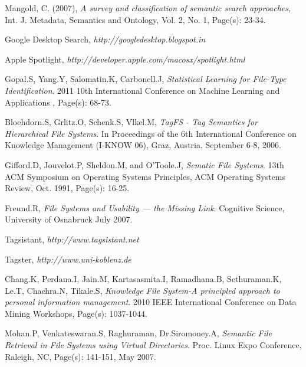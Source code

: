 ﻿\begin{thebibliography}{99}



Mangold, C. (2007), 
\emph{A survey and classification of semantic search approaches}, 
Int. J. Metadata, Semantics and Ontology, Vol. 2, No. 1, Page(s): 23-34.

Google Desktop Search,  
\emph{http://googledesktop.blogspot.in}

Apple Spotlight, 
\emph{http://developer.apple.com/macosx/spotlight.html}

Gopal.S, Yang.Y, Salomatin.K, Carbonell.J, 
\emph{Statistical Learning for File-Type Identification}.
2011 10th International Conference on Machine Learning and Applications , Page(s): 68-73.

Bloehdorn.S, Grlitz.O, Schenk.S, Vlkel.M, 
\emph{TagFS - Tag Semantics for Hierarchical File Systems}. 
In Proceedings of the 6th International Conference on Knowledge Management (I-KNOW 06), Graz, Austria, September 6-8, 2006.

 Gifford.D, Jouvelot.P, Sheldon.M, and O’Toole.J, 
\emph{Sematic File Systems}. 
13th ACM Symposium on Operating Systems Principles, ACM Operating Systems Review, Oct. 1991, Page(s): 16-25.

Freund.R, 
\emph{File Systems and Usability — the Missing Link}. 
Cognitive Science, University of Osnabruck
July 2007.

Tagsistant, 
\emph{http://www.tagsistant.net}

Tagster, 
\emph{http://www.uni-koblenz.de}

Chang.K, Perdana.I, Jain.M, Kartasasmita.I, Ramadhana.B, Sethuraman.K, Le.T, Chachra.N, Tikale.S, 
\emph{Knowledge File System-A principled approach to personal information management}.
2010 IEEE International Conference on Data Mining Workshops, 
Page(s): 1037-1044.

Mohan.P, Venkateswaran.S, Raghuraman, Dr.Siromoney.A, 
\emph{Semantic File Retrieval in File Systems using Virtual Directories}.
Proc. Linux Expo Conference, Raleigh, NC, Page(s): 141-151, May 2007.


\end{thebibliography}
